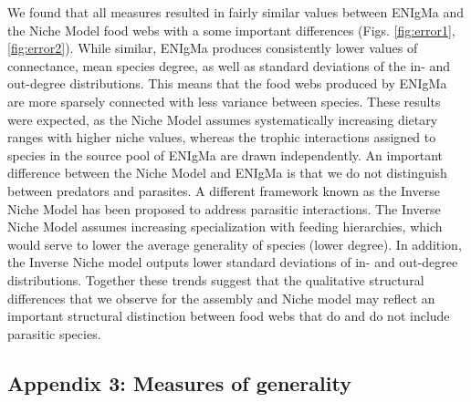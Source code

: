 \documentclass[twocolumn,preprintnumbers,amsmath,amssymb,superscriptaddress,linenumbers]{revtex4-1}
\begin{document}
We found that all measures resulted in fairly similar values between ENIgMa and the Niche Model food webs with a some important differences (Figs. \ref{fig:error1},\ref{fig:error2}).
While similar, ENIgMa produces consistently lower values of connectance, mean species degree, as well as standard deviations of the in- and out-degree distributions.
This means that the food webs produced by ENIgMa are more sparsely connected with less variance between species.
These results were expected, as the Niche Model assumes systematically increasing dietary ranges with higher niche values, whereas the trophic interactions assigned to species in the source pool of ENIgMa are drawn independently.
An important difference between the Niche Model and ENIgMa is that we do not distinguish between predators and parasites.
A different framework known as the Inverse Niche Model \cite{Warren2010} has been proposed to address parasitic interactions.
The Inverse Niche Model assumes increasing specialization with feeding hierarchies, which would serve to lower the average generality of species (lower degree).
In addition, the Inverse Niche model outputs lower standard deviations of in- and out-degree distributions.
Together these trends suggest that the qualitative structural differences that we observe for the assembly and Niche model may reflect an important structural distinction between food webs that do and do not include parasitic species.




\subsection*{Appendix 3: Measures of generality}
\end{document}

